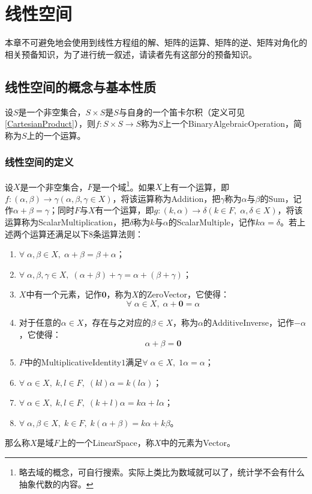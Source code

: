 \section{线性空间}

本章不可避免地会使用到线性方程组的解、矩阵的运算、矩阵的逆、矩阵对角化的相关预备知识，为了进行统一叙述，请读者先有这部分的预备知识。

\subsection{线性空间的概念与基本性质}

\begin{definition}
	设$S$是一个非空集合，$S\times S$是$S$与自身的一个笛卡尔积（定义可见\cref{CartesianProduct}），则$f:S\times S\rightarrow S$称为$S$上一个\gls{BinaryAlgebraicOperation}，简称为$S$上的一个运算。
\end{definition}
\subsubsection{线性空间的定义}
\begin{definition}
	设$X$是一个非空集合，$F$是一个域\footnote{略去域的概念，可自行搜索。实际上类比为数域就可以了，统计学不会有什么抽象代数的内容。}。如果$X$上有一个运算，即$f:(\alpha,\beta)\rightarrow\gamma(\alpha,\beta,\gamma\in X)$，将该运算称为\gls{Addition}，把$\gamma$称为$\alpha$与$\beta$的\gls{Sum}，记作$\alpha+\beta=\gamma$；同时$F$与$X$有一个运算，即$g:(k,\alpha)\rightarrow\delta(k\in F,\;\alpha,\delta\in X)$，将该运算称为\gls{ScalarMultiplication}，把$\delta$称为$k$与$\alpha$的\gls{ScalarMultiple}，记作$k\alpha=\delta$。若上述两个运算还满足以下$8$条运算法则：
	\begin{enumerate}
		\item $\forall\;\alpha,\beta\in X,\;\alpha+\beta=\beta+\alpha$；
		\item $\forall\;\alpha,\beta,\gamma\in X,\;(\alpha+\beta)+\gamma=\alpha+(\beta+\gamma)$；
		\item $X$中有一个元素，记作$\mathbf{0}$，称为$X$的\gls{ZeroVector}，它使得：
		\begin{equation*}
			\forall\;\alpha\in X,\;\alpha+\mathbf{0}=\alpha
		\end{equation*}
		\item 对于任意的$\alpha\in X$，存在与之对应的$\beta\in X$，称为$\alpha$的\gls{AdditiveInverse}，记作$-\alpha$，它使得：
		\begin{equation*}
			\alpha+\beta=\mathbf{0}
		\end{equation*}
		\item $F$中的\gls{MultiplicativeIdentity}$1$满足$\forall\;\alpha\in X,\;1\alpha=\alpha$；
		\item $\forall\;\alpha\in X,\;k,l\in F,\;(kl)\alpha=k(l\alpha)$；
		\item $\forall\;\alpha\in X,\;k,l\in F,\;(k+l)\alpha=k\alpha+l\alpha$；
		\item $\forall\;\alpha,\beta\in X,\;k\in F,\;k(\alpha+\beta)=k\alpha+k\beta$。
	\end{enumerate}
	那么称$X$是域$F$上的一个\gls{LinearSpace}，称$X$中的元素为\gls{Vector}。
\end{definition}

